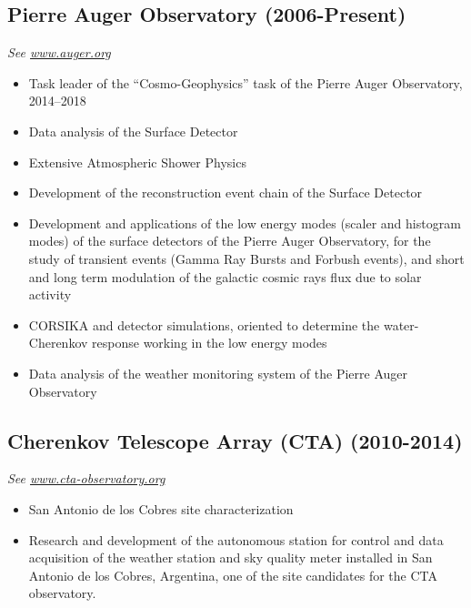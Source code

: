 \subsection*{Pierre Auger Observatory (2006-Present)}
{\small{\textit{See \href{http://www.auger.org/}{www.auger.org}}}}
\begin{itemize}
\item Task leader of the ``Cosmo-Geophysics'' task of the Pierre Auger Observatory, 2014--2018
\item Data analysis of the Surface Detector
\item Extensive Atmospheric Shower Physics
\item Development of the reconstruction event chain of the Surface Detector
\item Development and applications of the low energy modes (scaler and histogram
modes) of the surface detectors of the Pierre Auger Observatory, for the study
of transient events (Gamma Ray Bursts and Forbush events), and short and long
term modulation of the galactic cosmic rays flux due to solar activity
\item CORSIKA and detector simulations, oriented to determine the
water-Cherenkov response working in the low energy modes
\item Data analysis of the weather monitoring system of the Pierre Auger
Observatory
\end{itemize}
\subsection*{Cherenkov Telescope Array (CTA) (2010-2014)}
{\small{\textit{See \href{http://www.cta-observatory.org}{www.cta-observatory.org}}}}
\begin{itemize}
\item San Antonio de los Cobres site characterization
\item Research and development of the autonomous station for control and data
acquisition of the weather station and sky quality meter installed in San
Antonio de los Cobres, Argentina, one of the site candidates for the CTA
observatory.
\end{itemize}
\fi

